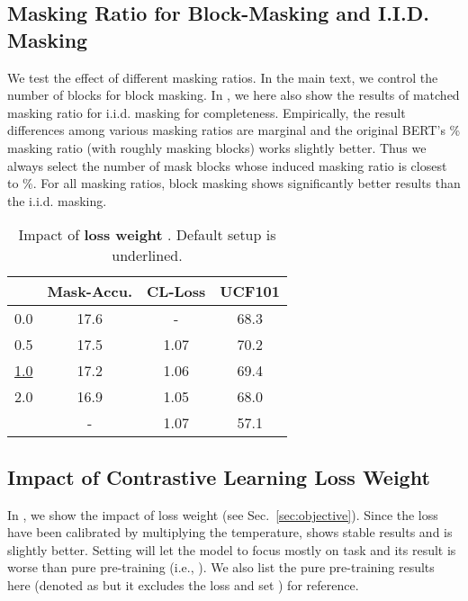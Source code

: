 \subsection{Masking Ratio for Block-Masking and I.I.D. Masking}
We test the effect of different masking ratios.
In the main text, we control the number of blocks for block masking.
In , we here also show the results of matched masking ratio for i.i.d. masking for completeness.
Empirically, the result differences among various masking ratios are marginal and the original BERT's \% masking ratio (with roughly  masking blocks) works slightly better.
Thus we always select the number of mask blocks whose induced masking ratio is closest to \%.
For all masking ratios, block masking shows significantly better results than the i.i.d. masking.



\begin{table}[t]
\centering
\caption{ Impact of \textbf{\ourcl loss weight }. Default setup is underlined. }
\begin{tabular}{l|ccc}
\toprule
           & Mask-Accu. & CL-Loss & UCF101 \\ \midrule
0.0                & 17.6      & -       & 68.3  \\
0.5                & 17.5      & 1.07    & 70.2  \\
\underline{1.0}                & 17.2      & 1.06    & 69.4  \\
2.0                & 16.9      & 1.05    & 68.0  \\
         & -         & 1.07    & 57.1  \\
\bottomrule
\end{tabular}\label{tab:loss_ratio}
\end{table}

\subsection{Impact of Contrastive Learning Loss Weight}
In , we show the impact of loss weight 
(see Sec.~\ref{sec:objective}).
Since the loss have been calibrated by multiplying the temperature,  shows stable results and  is slightly better. 
Setting  will let the model to focus mostly on \ourcl task and its result is worse than pure \ourmask pre-training (i.e., ).
We also list the pure \ourcl pre-training results here (denoted as  but it excludes the \ourmask loss and set ) for reference.








